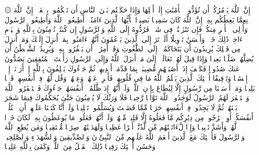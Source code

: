 \startbuffer[\q:4:58]
۞ إِنَّ ٱللَّهَ یَأۡمُرُكُمۡ أَن تُؤَدُّوا۟ ٱلۡأَمَٰنَٰتِ إِلَىٰۤ أَهۡلِهَا وَإِذَا حَكَمۡتُم بَیۡنَ ٱلنَّاسِ أَن تَحۡكُمُوا۟ بِٱلۡعَدۡلِۚ إِنَّ ٱللَّهَ نِعِمَّا یَعِظُكُم بِهِۦۤۗ إِنَّ ٱللَّهَ كَانَ سَمِیعَۢا بَصِیرࣰا%
\stopbuffer
\startbuffer[\q:4:59]
یَٰۤأَیُّهَا ٱلَّذِینَ ءَامَنُوۤا۟ أَطِیعُوا۟ ٱللَّهَ وَأَطِیعُوا۟ ٱلرَّسُولَ وَأُو۟لِی ٱلۡأَمۡرِ مِنكُمۡۖ فَإِن تَنَٰزَعۡتُمۡ فِی شَیۡءࣲ فَرُدُّوهُ إِلَى ٱللَّهِ وَٱلرَّسُولِ إِن كُنتُمۡ تُؤۡمِنُونَ بِٱللَّهِ وَٱلۡیَوۡمِ ٱلۡءَاخِرِۚ ذَٰلِكَ خَیۡرࣱ وَأَحۡسَنُ تَأۡوِیلًا%
\stopbuffer
\startbuffer[\q:4:60]
أَلَمۡ تَرَ إِلَى ٱلَّذِینَ یَزۡعُمُونَ أَنَّهُمۡ ءَامَنُوا۟ بِمَاۤ أُنزِلَ إِلَیۡكَ وَمَاۤ أُنزِلَ مِن قَبۡلِكَ یُرِیدُونَ أَن یَتَحَاكَمُوۤا۟ إِلَى ٱلطَّٰغُوتِ وَقَدۡ أُمِرُوۤا۟ أَن یَكۡفُرُوا۟ بِهِۦۖ وَیُرِیدُ ٱلشَّیۡطَٰنُ أَن یُضِلَّهُمۡ ضَلَٰلَۢا بَعِیدࣰا%
\stopbuffer
\startbuffer[\q:4:61]
وَإِذَا قِیلَ لَهُمۡ تَعَالَوۡا۟ إِلَىٰ مَاۤ أَنزَلَ ٱللَّهُ وَإِلَى ٱلرَّسُولِ رَأَیۡتَ ٱلۡمُنَٰفِقِینَ یَصُدُّونَ عَنكَ صُدُودࣰا%
\stopbuffer
\startbuffer[\q:4:62]
فَكَیۡفَ إِذَاۤ أَصَٰبَتۡهُم مُّصِیبَةُۢ بِمَا قَدَّمَتۡ أَیۡدِیهِمۡ ثُمَّ جَاۤءُوكَ یَحۡلِفُونَ بِٱللَّهِ إِنۡ أَرَدۡنَاۤ إِلَّاۤ إِحۡسَٰنࣰا وَتَوۡفِیقًا%
\stopbuffer
\startbuffer[\q:4:63]
أُو۟لَٰۤئِكَ ٱلَّذِینَ یَعۡلَمُ ٱللَّهُ مَا فِی قُلُوبِهِمۡ فَأَعۡرِضۡ عَنۡهُمۡ وَعِظۡهُمۡ وَقُل لَّهُمۡ فِیۤ أَنفُسِهِمۡ قَوۡلَۢا بَلِیغࣰا%
\stopbuffer
\startbuffer[\q:4:64]
وَمَاۤ أَرۡسَلۡنَا مِن رَّسُولٍ إِلَّا لِیُطَاعَ بِإِذۡنِ ٱللَّهِۚ وَلَوۡ أَنَّهُمۡ إِذ ظَّلَمُوۤا۟ أَنفُسَهُمۡ جَاۤءُوكَ فَٱسۡتَغۡفَرُوا۟ ٱللَّهَ وَٱسۡتَغۡفَرَ لَهُمُ ٱلرَّسُولُ لَوَجَدُوا۟ ٱللَّهَ تَوَّابࣰا رَّحِیمࣰا%
\stopbuffer
\startbuffer[\q:4:65]
فَلَا وَرَبِّكَ لَا یُؤۡمِنُونَ حَتَّىٰ یُحَكِّمُوكَ فِیمَا شَجَرَ بَیۡنَهُمۡ ثُمَّ لَا یَجِدُوا۟ فِیۤ أَنفُسِهِمۡ حَرَجࣰا مِّمَّا قَضَیۡتَ وَیُسَلِّمُوا۟ تَسۡلِیمࣰا%
\stopbuffer
\startbuffer[\q:4:66]
وَلَوۡ أَنَّا كَتَبۡنَا عَلَیۡهِمۡ أَنِ ٱقۡتُلُوۤا۟ أَنفُسَكُمۡ أَوِ ٱخۡرُجُوا۟ مِن دِیَٰرِكُم مَّا فَعَلُوهُ إِلَّا قَلِیلࣱ مِّنۡهُمۡۖ وَلَوۡ أَنَّهُمۡ فَعَلُوا۟ مَا یُوعَظُونَ بِهِۦ لَكَانَ خَیۡرࣰا لَّهُمۡ وَأَشَدَّ تَثۡبِیتࣰا%
\stopbuffer
\startbuffer[\q:4:67]
وَإِذࣰا لَّءَاتَیۡنَٰهُم مِّن لَّدُنَّاۤ أَجۡرًا عَظِیمࣰا%
\stopbuffer
\startbuffer[\q:4:68]
وَلَهَدَیۡنَٰهُمۡ صِرَٰطࣰا مُّسۡتَقِیمࣰا%
\stopbuffer
\startbuffer[\q:4:69]
وَمَن یُطِعِ ٱللَّهَ وَٱلرَّسُولَ فَأُو۟لَٰۤئِكَ مَعَ ٱلَّذِینَ أَنۡعَمَ ٱللَّهُ عَلَیۡهِم مِّنَ ٱلنَّبِیِّۦنَ وَٱلصِّدِّیقِینَ وَٱلشُّهَدَاۤءِ وَٱلصَّٰلِحِینَۚ وَحَسُنَ أُو۟لَٰۤئِكَ رَفِیقࣰا%
\stopbuffer
\startbuffer[\q:4:70]
ذَٰلِكَ ٱلۡفَضۡلُ مِنَ ٱللَّهِۚ وَكَفَىٰ بِٱللَّهِ عَلِیمࣰا%
\stopbuffer
\startbuffer[\q:4:71]
